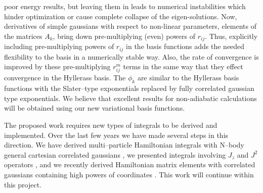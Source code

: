 poor energy results, but leaving them in leads to numerical instabilities
which hinder optimization or cause complete collapse of the eigen-solutions.
Now, derivatives of simple gaussians with respect to non-linear parameters,
elements of the matrices $A_k$, bring down pre-multiplying (even) powers of 
$r_{ij}$. Thus, explicitly including pre-multiplying powers of $r_{ij}$ in
the basis functions adds the needed flexibility to the basis in a
numerically stable way. Also, the rate of convergence is 
improved by these pre-multiplying $r_{ij}^m$ terms in the same way that they
effect convergence in the Hyllerass basis. The $\phi _k$ are similar to the
Hyllerass basis functions with the Slater--type exponentials replaced by
fully correlated gaussian type exponentials. We believe that excellent
results for non-adiabatic calculations will be obtained using
our new variational basis functions. 

The proposed work requires new types of integrals to be derived
and implemented. Over the last few years we have made several
steps in this direction. We have derived multi--particle
Hamiltonian integrals with N--body 
general cartesian correlated gaussians
\cite{kozlowski92a}, we presented integrals involving
$J_z$ and $J^2$ operators \cite{A20}, and we recently derived
Hamiltonian matrix elements with correlated gaussians
containing high powers of coordinates  \cite{A382}.
This work will continue within this project.

